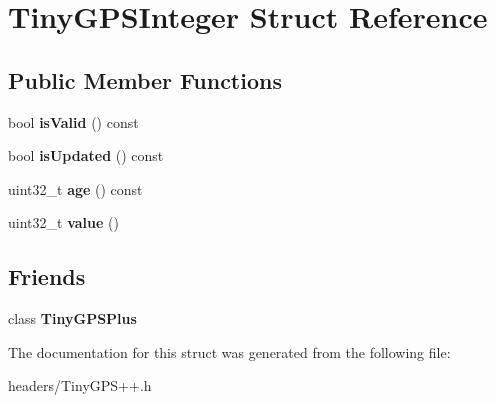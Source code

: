 \section{Tiny\+G\+P\+S\+Integer Struct Reference}
\label{struct_tiny_g_p_s_integer}
\subsection*{Public Member Functions}
\begin{DoxyCompactItemize}
\item 
bool {\bfseries is\+Valid} () const \label{struct_tiny_g_p_s_integer_aad411b5eb6cc16774ff0ff8d275df2fa}

\item 
bool {\bfseries is\+Updated} () const \label{struct_tiny_g_p_s_integer_aa6479670272df580287f84938183dc20}

\item 
uint32\+\_\+t {\bfseries age} () const \label{struct_tiny_g_p_s_integer_a46ea8f4fe8cca279b7d4cd44572e5881}

\item 
uint32\+\_\+t {\bfseries value} ()\label{struct_tiny_g_p_s_integer_a67de7e76d61dbd25eb32f701d8ce867b}

\end{DoxyCompactItemize}
\subsection*{Friends}
\begin{DoxyCompactItemize}
\item 
class {\bfseries Tiny\+G\+P\+S\+Plus}\label{struct_tiny_g_p_s_integer_a6501fd5ef19ae166d43e0e5781609ee2}

\end{DoxyCompactItemize}


The documentation for this struct was generated from the following file\+:\begin{DoxyCompactItemize}
\item 
headers/Tiny\+G\+P\+S++.\+h\end{DoxyCompactItemize}
